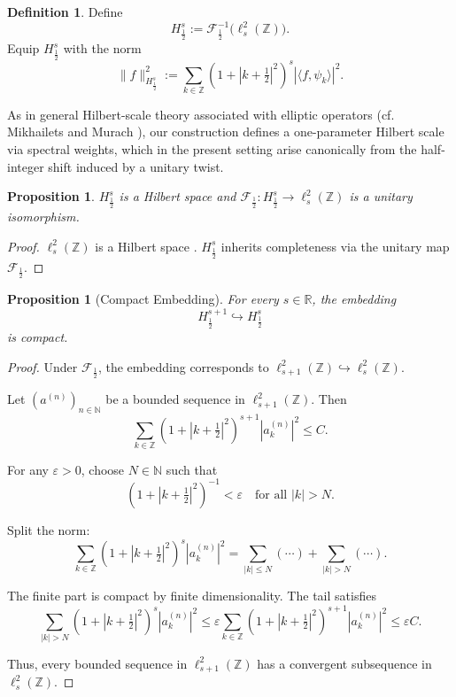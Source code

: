 \documentclass[11pt]{amsart}
\newtheorem{proposition}[theorem]{Proposition}
\theoremstyle{definition}
\newtheorem{definition}[theorem]{Definition}
\theoremstyle{remark}
\begin{document}
\begin{definition}
\label{def:twisted-sobolev}
Define
\[
H^s_{\frac{1}{2}} := \mathcal{F}_{\frac{1}{2}}^{-1}\bigl(\ell^2_s(\mathbb{Z})\bigr).
\]
Equip $H^s_{\frac{1}{2}}$ with the norm
\[
\|f\|_{H^s_{\frac{1}{2}}}^2 := \sum_{k \in \mathbb{Z}} (1 + |k+\tfrac{1}{2}|^2)^s |\langle f, \psi_k \rangle|^2.
\]
\end{definition}

As in general Hilbert-scale theory associated with elliptic operators
(cf. Mikhailets and Murach \cite{mikhailets-murach, MikhailetsMurach2013}),
our construction defines a one-parameter Hilbert scale via spectral weights,
which in the present setting arise canonically from the half-integer shift induced by a unitary twist.

\begin{proposition}
\label{prop:hilbert-scale}
$H^s_{\frac{1}{2}}$ is a Hilbert space and $\mathcal{F}_{\frac{1}{2}} : H^s_{\frac{1}{2}} \to \ell^2_s(\mathbb{Z})$ is a unitary isomorphism.
\end{proposition}

\begin{proof}
$\ell^2_s(\mathbb{Z})$ is a Hilbert space \cite{adams-fournier}. $H^s_{\frac{1}{2}}$ inherits completeness via the unitary map $\mathcal{F}_{\frac{1}{2}}$.
\end{proof}

\begin{proposition}[Compact Embedding]
\label{prop:compact-embedding}
For every $s \in \mathbb{R}$, the embedding
\[
H^{s+1}_{\frac{1}{2}} \hookrightarrow H^s_{\frac{1}{2}}
\]
is compact.
\end{proposition}

\begin{proof}
Under $\mathcal{F}_{\frac{1}{2}}$, the embedding corresponds to $\ell^2_{s+1}(\mathbb{Z}) \hookrightarrow \ell^2_s(\mathbb{Z})$.

Let $(a^{(n)})_{n \in \mathbb{N}}$ be a bounded sequence in $\ell^2_{s+1}(\mathbb{Z})$. Then
\[
\sum_{k \in \mathbb{Z}} (1 + |k+\tfrac{1}{2}|^2)^{s+1} |a^{(n)}_k|^2 \le C.
\]

For any $\varepsilon > 0$, choose $N \in \mathbb{N}$ such that
\[
(1 + |k+\tfrac{1}{2}|^2)^{-1} < \varepsilon \quad \text{for all } |k| > N.
\]

Split the norm:
\[
\sum_{k \in \mathbb{Z}} (1 + |k+\tfrac{1}{2}|^2)^s |a^{(n)}_k|^2 = \sum_{|k| \le N} (\cdots) + \sum_{|k| > N} (\cdots).
\]

The finite part is compact by finite dimensionality. The tail satisfies
\[
\sum_{|k| > N} (1 + |k+\tfrac{1}{2}|^2)^s |a^{(n)}_k|^2 \le \varepsilon \sum_{k \in \mathbb{Z}} (1 + |k+\tfrac{1}{2}|^2)^{s+1} |a^{(n)}_k|^2 \le \varepsilon C.
\]

Thus, every bounded sequence in $\ell^2_{s+1}(\mathbb{Z})$ has a convergent subsequence in $\ell^2_s(\mathbb{Z})$.
\end{proof}
\end{document}
